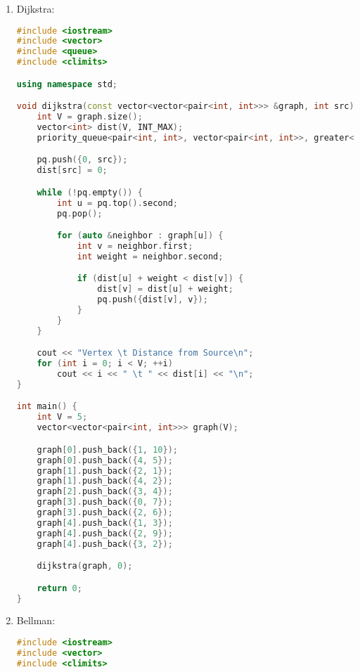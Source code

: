 \begin{enumerate}
\begin{lstlisting}[language=C++]
    cout << "Edge \tWeight\n";
    for (int i = 1; i < V; i++)
        cout << parent[i] << " - " << i << " \t" << graph[i][parent[i]] << " \n";
}

int main() {
    int V = 5;
    vector<vector<int>> graph = {
        {0, 2, 0, 6, 0},
        {2, 0, 3, 8, 5},
        {0, 3, 0, 0, 7},
        {6, 8, 0, 0, 9},
        {0, 5, 7, 9, 0}
    };

    PrimMST(graph, V);

    return 0;
}

	\end{lstlisting}
	\item Dijkstra:
	\begin{lstlisting}[language=C++]
	#include <iostream>
#include <vector>
#include <queue>
#include <climits>

using namespace std;

void dijkstra(const vector<vector<pair<int, int>>> &graph, int src) {
    int V = graph.size();
    vector<int> dist(V, INT_MAX);
    priority_queue<pair<int, int>, vector<pair<int, int>>, greater<pair<int, int>>> pq;

    pq.push({0, src});
    dist[src] = 0;

    while (!pq.empty()) {
        int u = pq.top().second;
        pq.pop();

        for (auto &neighbor : graph[u]) {
            int v = neighbor.first;
            int weight = neighbor.second;

            if (dist[u] + weight < dist[v]) {
                dist[v] = dist[u] + weight;
                pq.push({dist[v], v});
            }
        }
    }

    cout << "Vertex \t Distance from Source\n";
    for (int i = 0; i < V; ++i)
        cout << i << " \t " << dist[i] << "\n";
}

int main() {
    int V = 5;
    vector<vector<pair<int, int>>> graph(V);

    graph[0].push_back({1, 10});
    graph[0].push_back({4, 5});
    graph[1].push_back({2, 1});
    graph[1].push_back({4, 2});
    graph[2].push_back({3, 4});
    graph[3].push_back({0, 7});
    graph[3].push_back({2, 6});
    graph[4].push_back({1, 3});
    graph[4].push_back({2, 9});
    graph[4].push_back({3, 2});

    dijkstra(graph, 0);

    return 0;
}

	\end{lstlisting}
	\item Bellman:
	\begin{lstlisting}[language=C++]
	#include <iostream>
#include <vector>
#include <climits>


\end{lstlisting}
\end{enumerate}
